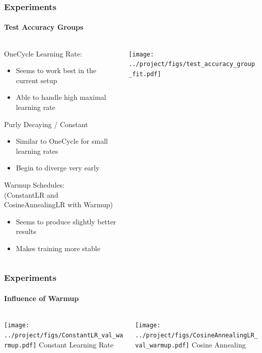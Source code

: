 \documentclass[10pt,aspectratio=169]{beamer}
\begin{document}
    \begin{frame}
        \frametitle{Experiments}
        \framesubtitle{Test Accuracy Groups}
        \begin{columns}
            \begin{column}{0.5\textwidth}
                OneCycle Learning Rate:
                \begin{itemize}
                    \item Seems to work best in the current setup 
                    \item Able to handle high maximal learning rate 
                \end{itemize}
                Purly Decaying / Constant
                \begin{itemize}
                    \item Similar to OneCycle for small learning rates
                    \item Begin to diverge very early
                \end{itemize}
                Warmup Schedules: \\ (ConstantLR and CosineAnnealingLR with Warmup)
                \begin{itemize}
                    \item Seems to produce slightly better results
                    \item Makes training more stable
                \end{itemize}
            \end{column}
            \begin{column}{0.5\textwidth}
                \texttt{[image: ../project/figs/test\_accuracy\_group\_fit.pdf]}
            \end{column}
        \end{columns}
    \end{frame}

    \begin{frame}
        \frametitle{Experiments}
        \framesubtitle{Influence of Warmup}
        \begin{columns}
            \begin{column}{0.5\textwidth}
                \texttt{[image: ../project/figs/ConstantLR\_val\_warmup.pdf]}
                Constant Learning Rate
            \end{column}
            \begin{column}{0.5\textwidth}
                \texttt{[image: ../project/figs/CosineAnnealingLR\_val\_warmup.pdf]}
                Cosine Annealing
            \end{column}
        \end{columns}
    \end{frame}
    
\end{document}
